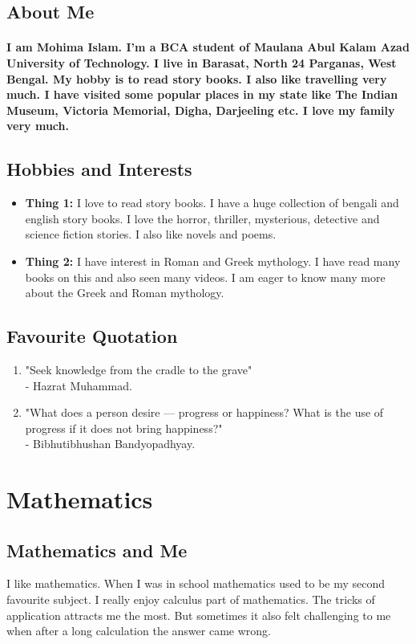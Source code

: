 \documentclass[12pt]{article}
\begin{document}
\subsection{About Me}
\paragraph{I am Mohima Islam. I'm a BCA student of Maulana Abul Kalam Azad University of Technology. I live in Barasat, North 24 Parganas, West Bengal. My hobby is to read story books. I also like travelling very much. I have visited some popular places in my state like The Indian Museum, Victoria Memorial, Digha, Darjeeling etc. I love my family very much. }
\subsection{Hobbies and Interests}
\begin{itemize}
    \item \textbf{Thing 1: }I love to read story books. I have a huge collection of bengali and english story books. I love the horror, thriller, mysterious, detective and science fiction stories. I also like novels and poems.
    \item \textbf{Thing 2: }I have interest in Roman and Greek mythology. I have read many books on this and also seen many videos. I am eager to know many more about the Greek and Roman mythology. 
\end{itemize}
\subsection{Favourite Quotation}
\begin{enumerate} 
    \item "Seek knowledge from the cradle to the grave"\\
    - Hazrat Muhammad.
    \item "What does a person desire --- progress or happiness? What is the use of progress if it does not bring happiness?"\\
    - Bibhutibhushan Bandyopadhyay.
    \end{enumerate}
    \section{Mathematics}

\subsection{Mathematics and Me}
I like mathematics. When I was in school mathematics used to be my second favourite subject. I really enjoy calculus part of mathematics. The tricks of application attracts me the most. But sometimes it also felt challenging to me when after a long calculation the answer came wrong.
\end{document}

